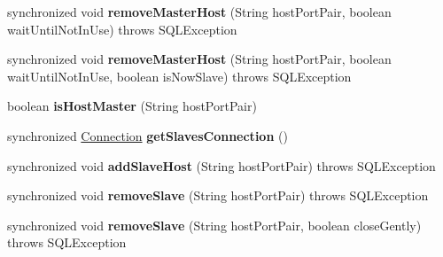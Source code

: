 \begin{DoxyCompactItemize}
\item 
\mbox{\label{classcom_1_1mysql_1_1jdbc_1_1_replication_connection_proxy_a28a707d3c1c63e81bb585dae11dae71b}} 
synchronized void {\bfseries remove\+Master\+Host} (String host\+Port\+Pair, boolean wait\+Until\+Not\+In\+Use)  throws S\+Q\+L\+Exception 
\item 
\mbox{\label{classcom_1_1mysql_1_1jdbc_1_1_replication_connection_proxy_ab68974b16605dbf183e6d99b1463f94a}} 
synchronized void {\bfseries remove\+Master\+Host} (String host\+Port\+Pair, boolean wait\+Until\+Not\+In\+Use, boolean is\+Now\+Slave)  throws S\+Q\+L\+Exception 
\item 
\mbox{\label{classcom_1_1mysql_1_1jdbc_1_1_replication_connection_proxy_a1517a43a2e4bf41c26a8dfd4b87f33c3}} 
boolean {\bfseries is\+Host\+Master} (String host\+Port\+Pair)
\item 
\mbox{\label{classcom_1_1mysql_1_1jdbc_1_1_replication_connection_proxy_af89d3f8b715ae9ccbe17ce65a31e8d54}} 
synchronized \mbox{\hyperlink{interfacecom_1_1mysql_1_1jdbc_1_1_connection}{Connection}} {\bfseries get\+Slaves\+Connection} ()
\item 
\mbox{\label{classcom_1_1mysql_1_1jdbc_1_1_replication_connection_proxy_a5f6a95ee0c3213f2788a02c0420d4be3}} 
synchronized void {\bfseries add\+Slave\+Host} (String host\+Port\+Pair)  throws S\+Q\+L\+Exception 
\item 
\mbox{\label{classcom_1_1mysql_1_1jdbc_1_1_replication_connection_proxy_a81fbde46cac9a8ee5301aa651ac9dd68}} 
synchronized void {\bfseries remove\+Slave} (String host\+Port\+Pair)  throws S\+Q\+L\+Exception 
\item 
\mbox{\label{classcom_1_1mysql_1_1jdbc_1_1_replication_connection_proxy_a2b4d41b913807e8ba6bdd6469a3d4e38}} 
synchronized void {\bfseries remove\+Slave} (String host\+Port\+Pair, boolean close\+Gently)  throws S\+Q\+L\+Exception 

\end{DoxyCompactItemize}
